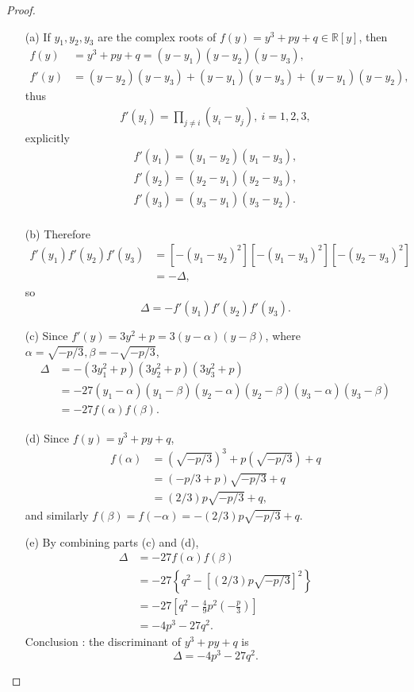 \documentclass[11pt,a4paper]{article}
\newcommand{\R}{\mathbb{R}}
\begin{document}
\begin{proof}
\begin{enumerate}
\item[(a)]
If $y_1, y_2,y_3$ are the complex roots of $f(y)= y^3+py+q \in \R[y]$, then
\begin{align*}
 f(y)&= y^3+py+q=(y-y_1)(y-y_2)(y-y_3),\\
f'(y)&=(y-y_2)(y-y_3)+(y-y_1)(y-y_3)+(y-y_1)(y-y_2),
\end{align*}
thus
\begin{align*}
f'(y_i) = \prod_{j\neq i}(y_i-y_j),\  i=1,2,3,
\end{align*}
explicitly
\begin{align*}
f'(y_1) = (y_1-y_2)(y_1-y_3),\\
f'(y_2) = (y_2-y_1)(y_2-y_3),\\
f'(y_3) = (y_3-y_1)(y_3-y_2).\\
\end{align*}
\item[(b)] Therefore
\begin{align*}
f'(y_1)f'(y_2)f'(y_3) &= [-(y_1-y_2)^2][-(y_1-y_3)^2][-(y_2-y_3)^2]\\
&=-\Delta,
\end{align*}
so
$$\Delta = -f'(y_1)f'(y_2)f'(y_3).$$
\item[(c)] Since $f'(y) = 3y^2 + p =3(y-\alpha)(y-\beta)$, where $\alpha =\sqrt{-p/3}, \beta = - \sqrt{-p/3}$,
\begin{align*}
\Delta&=-(3y_1^2+p)(3y_2^2+p)(3y_3^2+p)\\
&=-27(y_1-\alpha)(y_1-\beta)(y_2-\alpha)(y_2-\beta)(y_3-\alpha)(y_3-\beta)\\
&=-27f(\alpha)f(\beta).
\end{align*}
\item[(d)] Since $f(y) = y^3 + py +q$, 
\begin{align*}
f(\alpha) &=\left(\sqrt{-p/3}\right)^3 + p(\sqrt{-p/3})+q\\
&=(-p/3+p)\sqrt{-p/3}+q\\
&=(2/3)p\sqrt{-p/3}+q,
\end{align*}
and similarly $f(\beta) = f(-\alpha) = -(2/3)p\sqrt{-p/3}+q$.
\item[(e)] By combining parts (c) and (d), 
\begin{align*}
\Delta&=-27f(\alpha)f(\beta)\\
&=-27\left\{q^2-\left[(2/3)p\sqrt{-p/3}\right]^2\right\}\\
&=-27\left[q^2 -\frac{4}{9}p^2\left(-\frac{p}{3}\right)\right]\\
&=-4p^3-27q^2.
\end{align*}
Conclusion : the discriminant of  $y^3+py+q$ is $$\Delta = -4p^3-27q^2.$$
\end{enumerate}
\end{proof}
\end{document}
